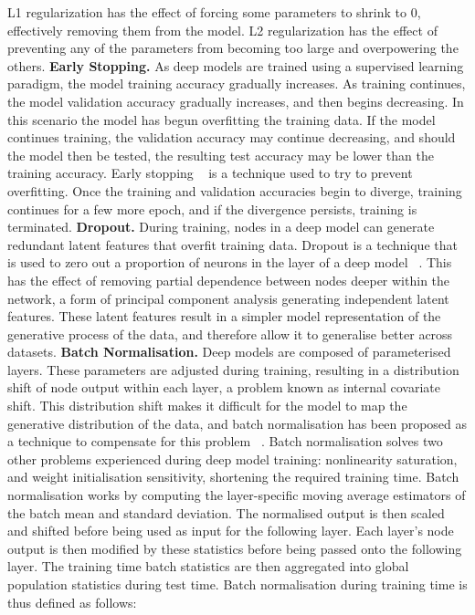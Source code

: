 L1 regularization has the effect of forcing some parameters to shrink to 0, effectively removing them from the model. L2 regularization has the effect of preventing any of the parameters from becoming too large and overpowering the others. \newline
\textbf{Early Stopping.} As deep models are trained using a supervised learning paradigm, the model training accuracy gradually increases. As training continues, the model validation accuracy gradually increases, and then begins decreasing. In this scenario the model has begun overfitting the training data. If the model continues training, the validation accuracy may continue decreasing, and should the model then be tested, the resulting test accuracy may be lower than the training accuracy. Early stopping ~\citep{prechelt1998early} is a technique used to try to prevent overfitting. Once the training and validation accuracies begin to diverge, training continues for a few more epoch, and if the divergence persists, training is terminated. \newline
\textbf{Dropout.} During training, nodes in a deep model can generate redundant latent features that overfit training data. Dropout is a technique that is used to zero out a proportion of neurons in the layer of a deep model ~\citep{srivastava2014dropout}. This has the effect of removing partial dependence between nodes deeper within the network, a form of principal component analysis generating independent latent features. These latent features result in a simpler model representation of the generative process of the data, and therefore allow it to generalise better across datasets. \newline
\textbf{Batch Normalisation.} Deep models are composed of parameterised layers. These parameters are adjusted during training, resulting in a distribution shift of node output within each layer, a problem known as internal covariate shift. This distribution shift makes it difficult for the model to map the generative distribution of the data, and batch normalisation has been proposed as a technique to compensate for this problem ~\citep{ioffe2015batch}. Batch normalisation solves two other problems experienced during deep model training: nonlinearity saturation, and weight initialisation sensitivity, shortening the required training time. \newline
Batch normalisation works by computing the layer-specific moving average estimators of the batch mean and standard deviation. The normalised output is then scaled and shifted before being used as input for the following layer. Each layer's node output is then modified by these statistics before being passed onto the following layer. The training time batch statistics are then aggregated into global population statistics during test time. \newline
Batch normalisation during training time is thus defined as follows:

